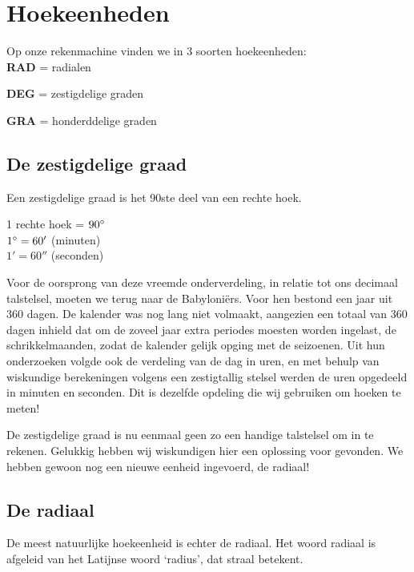 \documentclass[a4paper,12pt]{article}
\begin{document}
\pagestyle{fancy}
\lhead{}

\onehalfspacing


\section{Hoekeenheden}
Op onze rekenmachine vinden we in  3 soorten hoekeenheden:\\

\textbf{RAD} = radialen

\textbf{DEG} = zestigdelige graden

\textbf{GRA} = honderddelige graden

\subsection{De zestigdelige graad}
Een zestigdelige graad is het 90ste deel van een rechte hoek.\\
\begin{center}
1 rechte hoek = $90^\circ$\\
$1^\circ = 60'$ (minuten)\\
$1' = 60''$ (seconden)\\
\end{center}
Voor de oorsprong van deze vreemde onderverdeling, in relatie tot ons decimaal talstelsel, moeten we terug naar de Babyloniërs. Voor hen bestond een jaar uit 360 dagen. De kalender was nog lang niet volmaakt, aangezien een totaal van 360 dagen inhield dat om de zoveel jaar extra periodes moesten worden ingelast, de schrikkelmaanden, zodat de kalender gelijk opging met de seizoenen. Uit hun onderzoeken volgde ook de verdeling van de dag in uren, en met behulp van wiskundige berekeningen volgens een zestigtallig stelsel werden de uren opgedeeld in minuten en seconden.
Dit is dezelfde opdeling die wij gebruiken om hoeken te meten!

De zestigdelige graad is nu eenmaal geen zo een handige talstelsel om in te rekenen. Gelukkig hebben wij wiskundigen hier een oplossing voor gevonden. We hebben gewoon nog een nieuwe eenheid ingevoerd, de radiaal!

\subsection{De radiaal}
De meest natuurlijke hoekeenheid is echter de radiaal. Het woord radiaal is afgeleid van het Latijnse woord ‘radius’, dat straal betekent.
\end{document}
